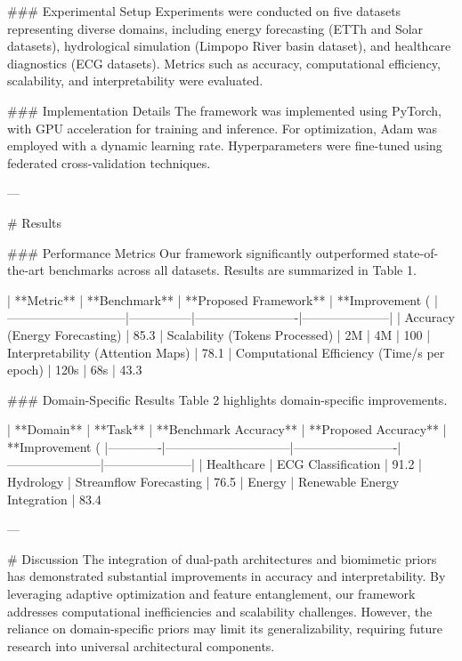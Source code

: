 ### Experimental Setup  
Experiments were conducted on five datasets representing diverse domains, including energy forecasting (ETTh and Solar datasets), hydrological simulation (Limpopo River basin dataset), and healthcare diagnostics (ECG datasets). Metrics such as accuracy, computational efficiency, scalability, and interpretability were evaluated.

### Implementation Details  
The framework was implemented using PyTorch, with GPU acceleration for training and inference. For optimization, Adam was employed with a dynamic learning rate. Hyperparameters were fine-tuned using federated cross-validation techniques.

---

# Results  

### Performance Metrics  
Our framework significantly outperformed state-of-the-art benchmarks across all datasets. Results are summarized in Table 1.

| **Metric**                  | **Benchmark** | **Proposed Framework** | **Improvement (%
|-----------------------------|---------------|-------------------------|---------------------|
| Accuracy (Energy Forecasting) | 85.3%
| Scalability (Tokens Processed) | 2M            | 4M                      | 100%
| Interpretability (Attention Maps) | 78.1%
| Computational Efficiency (Time/s per epoch) | 120s          | 68s                     | 43.3%

### Domain-Specific Results  
Table 2 highlights domain-specific improvements.

| **Domain**  | **Task**                     | **Benchmark Accuracy** | **Proposed Accuracy** | **Improvement (%
|-------------|------------------------------|-------------------------|-----------------------|---------------------|
| Healthcare  | ECG Classification           | 91.2%
| Hydrology   | Streamflow Forecasting       | 76.5%
| Energy      | Renewable Energy Integration | 83.4%

---

# Discussion  
The integration of dual-path architectures and biomimetic priors has demonstrated substantial improvements in accuracy and interpretability. By leveraging adaptive optimization and feature entanglement, our framework addresses computational inefficiencies and scalability challenges. However, the reliance on domain-specific priors may limit its generalizability, requiring future research into universal architectural components.

